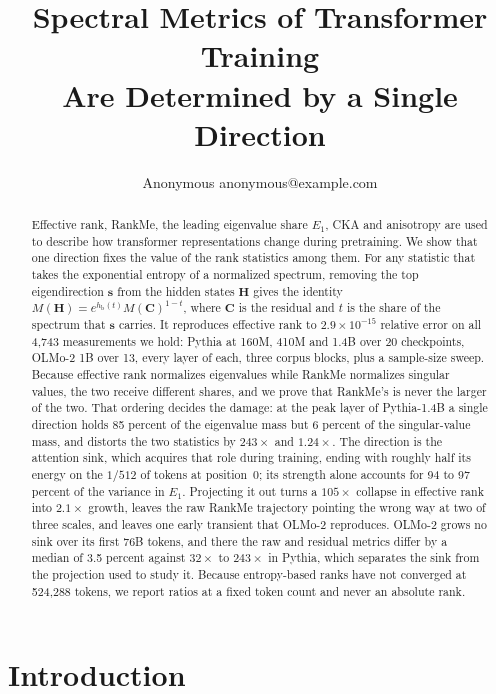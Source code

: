 \documentclass{article}
\title{Spectral Metrics of Transformer Training\\Are Determined by a Single Direction}
\author{\name Anonymous \email anonymous@example.com}
\theoremstyle{spaced}
\theoremstyle{definition}
\newcommand{\bH}{\mathbf{H}}
\newcommand{\bC}{\mathbf{C}}
\newcommand{\bs}{\mathbf{s}}
\newcommand{\hb}{h_{\mathrm{b}}}
\begin{document}
\maketitle

\begin{abstract}
Effective rank, RankMe, the leading eigenvalue share $E_1$, CKA and anisotropy are used to describe how transformer representations change during pretraining. We show that one direction fixes the value of the rank statistics among them. For any statistic that takes the exponential entropy of a normalized spectrum, removing the top eigendirection $\bs$ from the hidden states $\bH$ gives the identity $M(\bH) = e^{\hb(t)}M(\bC)^{1-t}$, where $\bC$ is the residual and $t$ is the share of the spectrum that $\bs$ carries. It reproduces effective rank to $2.9\times10^{-15}$ relative error on all 4{,}743 measurements we hold: Pythia at 160M, 410M and 1.4B over 20 checkpoints, OLMo-2 1B over 13, every layer of each, three corpus blocks, plus a sample-size sweep. Because effective rank normalizes eigenvalues while RankMe normalizes singular values, the two receive different shares, and we prove that RankMe's is never the larger of the two. That ordering decides the damage: at the peak layer of Pythia-1.4B a single direction holds 85 percent of the eigenvalue mass but 6 percent of the singular-value mass, and distorts the two statistics by $243\times$ and $1.24\times$. The direction is the attention sink, which acquires that role during training, ending with roughly half its energy on the $1/512$ of tokens at position~0; its strength alone accounts for 94 to 97 percent of the variance in $E_1$. Projecting it out turns a $105\times$ collapse in effective rank into $2.1\times$ growth, leaves the raw RankMe trajectory pointing the wrong way at two of three scales, and leaves one early transient that OLMo-2 reproduces. OLMo-2 grows no sink over its first 76B tokens, and there the raw and residual metrics differ by a median of 3.5 percent against $32\times$ to $243\times$ in Pythia, which separates the sink from the projection used to study it. Because entropy-based ranks have not converged at 524{,}288 tokens, we report ratios at a fixed token count and never an absolute rank.
\end{abstract}

\section{Introduction}
\label{sec:intro}
\end{document}
